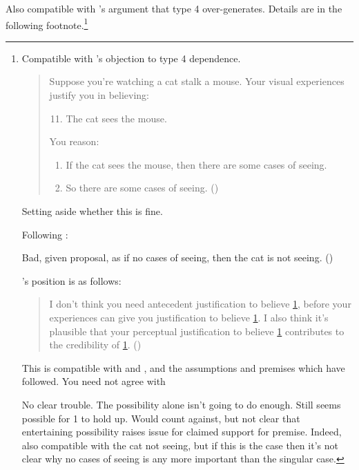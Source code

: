 \begin{note}
  Also compatible with \citeauthor{Pryor:2004ws}'s argument that type 4 over-generates.
  Details are in the following footnote.\footnote{
  Compatible with \citeauthor{Pryor:2004ws}'s objection to type 4 dependence.

    \begin{quote}
      Suppose you're watching a cat stalk a mouse. Your visual experiences justify you in believing:

      \begin{enumerate}[label=(\arabic*), ref=(\arabic*)]
        \setcounter{enumi}{10}
      \item\label{illu:Pryor:cat:1} The cat sees the mouse.
      \end{enumerate}

      You reason:

      \begin{enumerate}[label=(\arabic*), ref=(\arabic*), resume]
      \item\label{illu:Pryor:cat:2} If the cat sees the mouse, then there are some cases of seeing.
      \item\label{illu:Pryor:cat:3} So there are some cases of seeing.\nolinebreak
        \mbox{}\hfill\mbox{(\citeyear[361]{Pryor:2004ws})}
      \end{enumerate}
    \end{quote}

  Setting aside whether this is fine.

  Following \citeauthor{Pryor:2004ws}:

  Bad, given proposal, as if no cases of seeing, then the cat is not seeing. (\citeyear[361]{Pryor:2004ws})

  \citeauthor{Pryor:2004ws}'s position is as follows:

  \begin{quote}
    I don't think you need antecedent justification to believe \ref{illu:Pryor:cat:3}, before your experiences can give you justification to believe \ref{illu:Pryor:cat:1}.
    I also think it's plausible that your perceptual justification to believe \ref{illu:Pryor:cat:1} contributes to the credibility of \ref{illu:Pryor:cat:3}.\nolinebreak
    \mbox{}\hfill\mbox{(\citeyear[361]{Pryor:2004ws})}
  \end{quote}

  This is compatible with \ideaCSA{} and \ideaCSB{}, and the assumptions and premises which have followed.
  You need not agree with \citeauthor{Pryor:2004ws}

  No clear trouble.
  The possibility alone isn't going to do enough.
  Still seems possible for 1 to hold up.
  Would count against, but not clear that entertaining possibility raises issue for claimed support for premise.
  Indeed, also compatible with the cat not seeing, but if this is the case then it's not clear why no cases of seeing is any more important than the singular case.
  }
\end{note}

